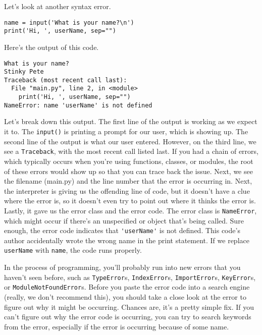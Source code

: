Let's look at another syntax error.\par
\begin{lstlisting}[style=pippython]
name = input('What is your name?\n')
print('Hi, ', userName, sep="")
\end{lstlisting}
Here's the output of this code.\par
\begin{lstlisting}[style=none]
What is your name?
Stinky Pete
Traceback (most recent call last):
  File "main.py", line 2, in <module>
    print('Hi, ', userName, sep="")
NameError: name 'userName' is not defined
\end{lstlisting}
Let's break down this output. The first line of the output is working as we expect it to. The \verb|input()| is printing a prompt for our user, which is showing up. The second line of the output is what our user entered. However, on the third line, we see a \verb|Traceback|, with the most recent call listed last. If you had a chain of errors, which typically occurs when you're using functions, classes, or modules, the root of these errors would show up so that you can trace back the issue. Next, we see the filename (main.py) and the line number that the error is occurring in. Next, the interpreter is giving us the offending line of code, but it doesn't have a clue where the error is, so it doesn't even try to point out where it thinks the error is. Lastly, it gave us the error class and the error code. The error class is \verb|NameError|, which might occur if there's an unspecified  or object that's being called. Sure enough, the error code indicates that \verb|'userName'| is not defined. This code's author accidentally wrote the wrong  name in the print statement. If we replace \verb|userName| with \verb|name|, the code runs properly.\par
In the process of programming, you'll probably run into new errors that you haven't seen before, such as \verb|TypeError|s, \verb|IndexError|s, \verb|ImportError|s, \verb|KeyError|s, or \verb|ModuleNotFoundError|s. Before you paste the error code into a search engine (really, we don't recommend this), you should take a close look at the error to figure out why it might be occurring. Chances are, it's a pretty simple fix. If you can't figure out why the error code is occurring, you can try to search keywords from the error, especially if the error is occurring because of some  name.\par
